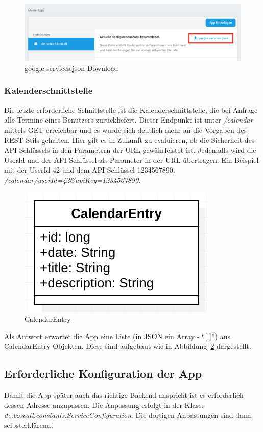 \begin{figure}
	\centering
	\includegraphics[width=\linewidth]{include/img/google-services-json}
	\caption{google-services.json Download}
	\label{fig:google-services-json-download}
\end{figure}

\subsubsection{Kalenderschnittstelle}
Die letzte erforderliche Schnittstelle ist die Kalenderschnittstelle, die bei Anfrage alle Termine eines Benutzers zurückliefert. Dieser Endpunkt ist unter \textit{/calendar} mittels GET erreichbar und es wurde sich deutlich mehr an die Vorgaben des REST Stils gehalten. Hier gilt es in Zukunft zu evaluieren, ob die Sicherheit des API Schlüssels in den Parametern der URL gewährleistet ist. Jedenfalls wird die UserId und der API Schlüssel als Parameter in der URL übertragen. Ein Beispiel mit der UserId 42 und dem API Schlüssel 1234567890: \textit{/calendar/userId=42\&apiKey=1234567890}.

\begin{figure}[h]
	\centering
	\includegraphics{include/img/calendarentry}
	\caption{CalendarEntry}
	\label{fig:calendarEntry}
\end{figure}
Als Antwort erwartet die App eine Liste (in JSON ein Array - \enquote{[ ]}) aus CalendarEntry-Objekten. Diese sind aufgebaut wie in Abbildung~\ref{fig:calendarEntry} dargestellt.

\subsection{Erforderliche Konfiguration der App}
Damit die App später auch das richtige Backend anspricht ist es erforderlich dessen Adresse anzupassen. Die Anpassung erfolgt in der Klasse\\ \textit{de.boscall.constants.ServiceConfiguration}. Die dortigen Anpassungen sind dann selbsterklärend.


